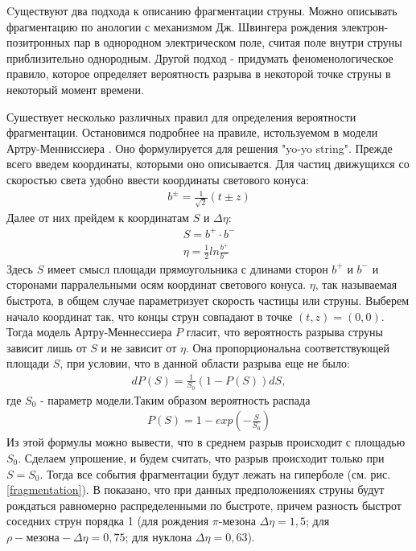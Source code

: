 \documentclass[12pt]{article}
\renewcommand{\l}{\left( }
\renewcommand{\r}{\right) }
\newcommand{\br}[1]{\l {#1} \r}
\begin{document}
Cуществуют два подхода к описанию фрагментации струны. Можно описывать фрагментацию по анологии с механизмом Дж. Швингера \cite{schwinger} рождения электрон-позитронных пар в однородном электрическом поле, считая поле внутри струны приблизительно однородным. Другой подход - придумать феноменологическое правило, которое определяет вероятность разрыва в некоторой точке струны в некоторый момент времени. 

Сушествует несколько различных правил для определения вероятности фрагментации. Остановимся подробнее на правиле, истользуемом в модели Артру-Менниссиера \cite{artru}. Оно формулируется для решения "yo-yo string". Прежде всего введем координаты, которыми оно описывается. Для частиц движущихся со скоростью света удобно ввести координаты светового конуса:
\begin{gather}
b^{\pm} = \frac{1}{\sqrt 2} \br{t \pm z}
\end{gather}
Далее от них прейдем к координатам $S$ и $\Delta \eta$:
\begin{gather}
S = b^+ \cdot b^- \\
\eta = \frac{1}{2} ln \frac{b^+}{b^-}
\end{gather}
Здесь $S$ имеет смысл площади прямоугольника с длинами сторон $b^+$ и $b^-$ и сторонами парралельными осям координат светового конуса. $\eta$, так называемая быстрота, в общем случае параметризует скорость частицы или струны. Выберем начало координат так, что концы струн совпадают в точке $(t, z) = (0, 0)$. Тогда модель Артру-Меннессиера $P$ гласит, что вероятность разрыва струны зависит лишь от $S$ и не зависит от $\eta$. Она пропорциональна соответствующей площади $S$, при условии, что в данной области разрыва еще не было:
\begin{gather}
dP \br{S} = \frac{1}{S_0} \br{1 - P \br{S}} dS,
\end{gather}
где $S_0$ - параметр модели.Таким образом вероятность распада
\begin{gather}
P \br{S} = 1 - exp \br{-\frac{S}{S_0}}
\end{gather}
Из этой формулы можно вывести, что в среднем разрыв происходит с площадью $S_0$. Сделаем упрошение, и будем считать, что разрыв происходит только при $S=S_0$. Тогда все события фрагментации будут лежать на гиперболе (см. рис. \ref{fragmentation}). В \cite{fragmentation_lit} показано, что при данных предположениях струны будут рождаться равномерно распределенными по быстроте, причем разность быстрот соседних струн порядка 1 (для рождения $\pi\text{-мезона}$ $\Delta \eta = 1,5$; для $\rho-\text{мезона} - \Delta \eta = 0,75$; для нуклона $\Delta \eta = 0,63$).
\end{document}
